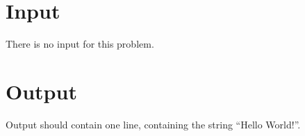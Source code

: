 
\section*{Input}

There is no input for this problem.

\section*{Output}

Output should contain one line, containing the string ``Hello World!''.
